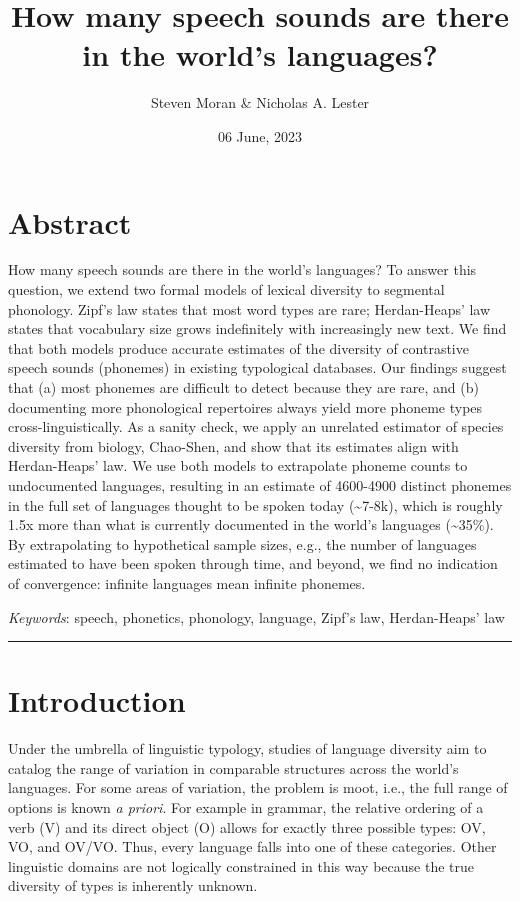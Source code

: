 \documentclass[
]{article}
\title{How many speech sounds are there in the world's languages?}
\author{Steven Moran \& Nicholas A. Lester}
\date{06 June, 2023}
\begin{document}
\maketitle

\hypertarget{abstract}{%
\section*{Abstract}\label{abstract}}

How many speech sounds are there in the world's languages? To answer
this question, we extend two formal models of lexical diversity to
segmental phonology. Zipf's law states that most word types are rare;
Herdan-Heaps' law states that vocabulary size grows indefinitely with
increasingly new text. We find that both models produce accurate
estimates of the diversity of contrastive speech sounds (phonemes) in
existing typological databases. Our findings suggest that (a) most
phonemes are difficult to detect because they are rare, and (b)
documenting more phonological repertoires always yield more phoneme
types cross-linguistically. As a sanity check, we apply an unrelated
estimator of species diversity from biology, Chao-Shen, and show that
its estimates align with Herdan-Heaps' law. We use both models to
extrapolate phoneme counts to undocumented languages, resulting in an
estimate of 4600-4900 distinct phonemes in the full set of languages
thought to be spoken today (\textasciitilde7-8k), which is roughly 1.5x
more than what is currently documented in the world's languages
(\textasciitilde35\%). By extrapolating to hypothetical sample sizes,
e.g., the number of languages estimated to have been spoken through
time, and beyond, we find no indication of convergence: infinite
languages mean infinite phonemes.

\emph{Keywords}: speech, phonetics, phonology, language, Zipf's law,
Herdan-Heaps' law

\begin{center}\rule{0.5\linewidth}{0.5pt}\end{center}

\hypertarget{introduction}{%
\section{Introduction}\label{introduction}}

Under the umbrella of linguistic typology, studies of language diversity
aim to catalog the range of variation in comparable structures across
the world's languages. For some areas of variation, the problem is moot,
i.e., the full range of options is known \emph{a priori}. For example in
grammar, the relative ordering of a verb (V) and its direct object (O)
allows for exactly three possible types: OV, VO, and OV/VO. Thus, every
language falls into one of these categories. Other linguistic domains
are not logically constrained in this way because the true diversity of
types is inherently unknown.
\end{document}
